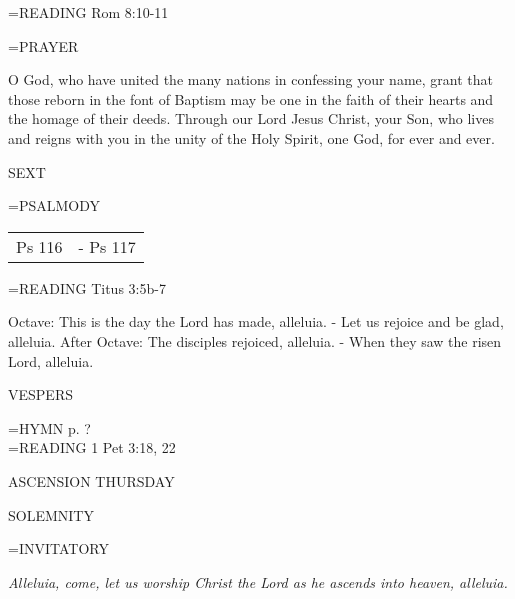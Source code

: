 \hangindent=\parindent \small{READING}    Rom 8:10-11 \textbf{   \\}

\hangindent=\parindent \small PRAYER
\begin{description}[labelindent=\parindent, noitemsep, leftmargin=*]
\item [Octave:] 	O God, who have united the many nations in confessing your name, grant that those reborn in the font of Baptism may be one in the faith of their hearts and the homage of their deeds. Through our Lord Jesus Christ, your Son, who lives and reigns with you in the unity of the Holy Spirit, one God, for ever and ever.
\item [After Octave:] 	
\end{description}

\begin{flushleft}\normalsize SEXT\\\end{flushleft}
\hangindent=\parindent \small{PSALMODY}
\begin{center}
\begin{tabular}{ l l }
Ps 116 &  - Ps 117\\
\end{tabular}
\end{center}		

\hangindent=\parindent \small{READING}    Titus 3:5b-7 \textbf{   }

Octave:	This is the day the Lord has made, alleluia.
		- Let us rejoice and be glad, alleluia.
After Octave:	The disciples rejoiced, alleluia.
		- When they saw the risen Lord, alleluia.

\begin{flushleft}\normalsize VESPERS\\\end{flushleft}
\hangindent=\parindent \small{\uppercase{HYMN} p.  ?\\}
\hangindent=\parindent \small{READING}    1 Pet 3:18, 22 \textbf{   \\}

\begin{center}
\normalsize ASCENSION THURSDAY
\end{center}
SOLEMNITY

\hangindent=\parindent \small{INVITATORY}
\begin{center}
\textit{Alleluia, come, let us worship Christ the Lord as he ascends into heaven, alleluia.\\}
\end{center}

